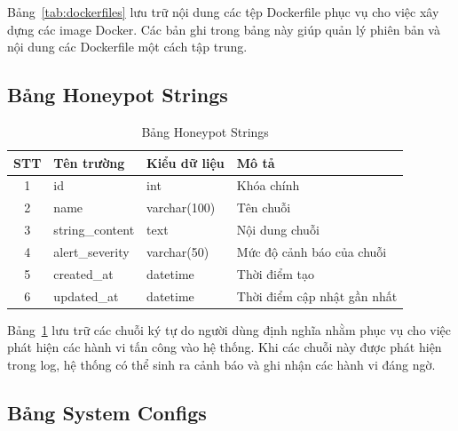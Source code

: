 \documentclass[../DoAn.tex]{subfiles}
\begin{document}
Bảng~\ref{tab:dockerfiles} lưu trữ nội dung các tệp Dockerfile phục vụ cho việc xây dựng các image Docker. Các bản ghi trong bảng này giúp quản lý phiên bản và nội dung các Dockerfile một cách tập trung.

\subsection{Bảng Honeypot Strings}

\begin{table}[H]
\centering
\begin{tabular}{|c|l|l|l|}
\hline
\textbf{STT} & \textbf{Tên trường}   & \textbf{Kiểu dữ liệu} & \textbf{Mô tả}                              \\ \hline
1            & id                    & int                  & Khóa chính                                  \\ \hline
2            & name                  & varchar(100)         & Tên chuỗi  \\ \hline
3            & string\_content       & text                 & Nội dung chuỗi                      \\ \hline
4            & alert\_severity       & varchar(50)          & Mức độ cảnh báo của chuỗi        \\ \hline
5            & created\_at           & datetime             & Thời điểm tạo                               \\ \hline
6            & updated\_at           & datetime             & Thời điểm cập nhật gần nhất                 \\ \hline
\end{tabular}
\caption{Bảng Honeypot Strings}
\label{tab:honeypot_strings}
\end{table}

Bảng~\ref{tab:honeypot_strings} lưu trữ các chuỗi ký tự do người dùng định nghĩa nhằm phục vụ cho việc phát hiện các hành vi tấn công vào hệ thống. Khi các chuỗi này được phát hiện trong log, hệ thống có thể sinh ra cảnh báo và ghi nhận các hành vi đáng ngờ.

\subsection{Bảng System Configs}
\end{document}
